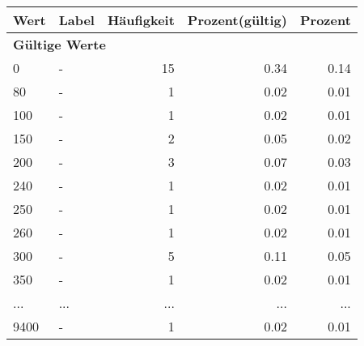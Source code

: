      \begin{longtable}{lXrrr}
     \toprule
     \textbf{Wert} & \textbf{Label} & \textbf{Häufigkeit} & \textbf{Prozent(gültig)} & \textbf{Prozent} \\
     \endhead
     \midrule
     \multicolumn{5}{l}{\textbf{Gültige Werte}}\\
        0 & \multicolumn{1}{X}{-} & %
          \num{15} &
          \num[round-mode=places,round-precision=2]{0,34} &
          \num[round-mode=places,round-precision=2]{0,14} \\
        80 & \multicolumn{1}{X}{-} & %
          \num{1} &
          \num[round-mode=places,round-precision=2]{0,02} &
          \num[round-mode=places,round-precision=2]{0,01} \\
        100 & \multicolumn{1}{X}{-} & %
          \num{1} &
          \num[round-mode=places,round-precision=2]{0,02} &
          \num[round-mode=places,round-precision=2]{0,01} \\
        150 & \multicolumn{1}{X}{-} & %
          \num{2} &
          \num[round-mode=places,round-precision=2]{0,05} &
          \num[round-mode=places,round-precision=2]{0,02} \\
        200 & \multicolumn{1}{X}{-} & %
          \num{3} &
          \num[round-mode=places,round-precision=2]{0,07} &
          \num[round-mode=places,round-precision=2]{0,03} \\
        240 & \multicolumn{1}{X}{-} & %
          \num{1} &
          \num[round-mode=places,round-precision=2]{0,02} &
          \num[round-mode=places,round-precision=2]{0,01} \\
        250 & \multicolumn{1}{X}{-} & %
          \num{1} &
          \num[round-mode=places,round-precision=2]{0,02} &
          \num[round-mode=places,round-precision=2]{0,01} \\
        260 & \multicolumn{1}{X}{-} & %
          \num{1} &
          \num[round-mode=places,round-precision=2]{0,02} &
          \num[round-mode=places,round-precision=2]{0,01} \\
        300 & \multicolumn{1}{X}{-} & %
          \num{5} &
          \num[round-mode=places,round-precision=2]{0,11} &
          \num[round-mode=places,round-precision=2]{0,05} \\
        350 & \multicolumn{1}{X}{-} & %
          \num{1} &
          \num[round-mode=places,round-precision=2]{0,02} &
          \num[round-mode=places,round-precision=2]{0,01} \\
       ... & ... & ... & ... & ... \\
        9400 & \multicolumn{1}{X}{-} & %
          \num{1} &
          \num[round-mode=places,round-precision=2]{0,02} &
          \num[round-mode=places,round-precision=2]{0,01} \\


\end{longtable}
